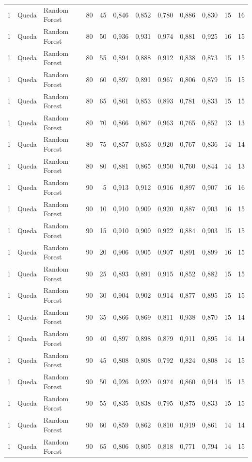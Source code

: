 \begin{longtable}{@{}rllrrrrrrrrr@{}}
1 & Queda & Random Forest & 80 & 45 & 0,846 & 0,852 & 0,780 & 0,886 & 0,830 & 15 & 16 \\
1 & Queda & Random Forest & 80 & 50 & 0,936 & 0,931 & 0,974 & 0,881 & 0,925 & 16 & 15 \\
1 & Queda & Random Forest & 80 & 55 & 0,894 & 0,888 & 0,912 & 0,838 & 0,873 & 15 & 15 \\
1 & Queda & Random Forest & 80 & 60 & 0,897 & 0,891 & 0,967 & 0,806 & 0,879 & 15 & 15 \\
1 & Queda & Random Forest & 80 & 65 & 0,861 & 0,853 & 0,893 & 0,781 & 0,833 & 15 & 15 \\
1 & Queda & Random Forest & 80 & 70 & 0,866 & 0,867 & 0,963 & 0,765 & 0,852 & 13 & 13 \\
1 & Queda & Random Forest & 80 & 75 & 0,857 & 0,853 & 0,920 & 0,767 & 0,836 & 14 & 14 \\
1 & Queda & Random Forest & 80 & 80 & 0,881 & 0,865 & 0,950 & 0,760 & 0,844 & 14 & 13 \\
1 & Queda & Random Forest & 90 & 5 & 0,913 & 0,912 & 0,916 & 0,897 & 0,907 & 16 & 16 \\
1 & Queda & Random Forest & 90 & 10 & 0,910 & 0,909 & 0,920 & 0,887 & 0,903 & 16 & 15 \\
1 & Queda & Random Forest & 90 & 15 & 0,910 & 0,909 & 0,922 & 0,884 & 0,903 & 15 & 15 \\
1 & Queda & Random Forest & 90 & 20 & 0,906 & 0,905 & 0,907 & 0,891 & 0,899 & 16 & 15 \\
1 & Queda & Random Forest & 90 & 25 & 0,893 & 0,891 & 0,915 & 0,852 & 0,882 & 15 & 15 \\
1 & Queda & Random Forest & 90 & 30 & 0,904 & 0,902 & 0,914 & 0,877 & 0,895 & 15 & 15 \\
1 & Queda & Random Forest & 90 & 35 & 0,866 & 0,869 & 0,811 & 0,938 & 0,870 & 15 & 14 \\
1 & Queda & Random Forest & 90 & 40 & 0,897 & 0,898 & 0,879 & 0,911 & 0,895 & 14 & 14 \\
1 & Queda & Random Forest & 90 & 45 & 0,808 & 0,808 & 0,792 & 0,824 & 0,808 & 14 & 15 \\
1 & Queda & Random Forest & 90 & 50 & 0,926 & 0,920 & 0,974 & 0,860 & 0,914 & 15 & 15 \\
1 & Queda & Random Forest & 90 & 55 & 0,835 & 0,838 & 0,795 & 0,875 & 0,833 & 15 & 15 \\
1 & Queda & Random Forest & 90 & 60 & 0,859 & 0,862 & 0,810 & 0,919 & 0,861 & 14 & 14 \\
1 & Queda & Random Forest & 90 & 65 & 0,806 & 0,805 & 0,818 & 0,771 & 0,794 & 14 & 15 \\

\end{longtable}
